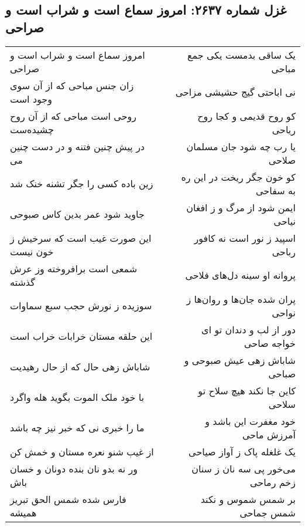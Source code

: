 \begin{center}
\section*{غزل شماره ۲۶۳۷: امروز سماع است و شراب است و صراحی}
\label{sec:2637}
\begin{longtable}{l p{0.5cm} r}
امروز سماع است و شراب است و صراحی
&&
یک ساقی بدمست یکی جمع مباحی
\\
زان جنس مباحی که از آن سوی وجود است
&&
نی اباحتی گیج حشیشی مزاحی
\\
روحی است مباحی که از آن روح چشیده‌ست
&&
کو روح قدیمی و کجا روح ریاحی
\\
در پیش چنین فتنه و در دست چنین می
&&
یا رب چه شود جان مسلمان صلاحی
\\
زین باده کسی را جگر تشنه خنک شد
&&
کو خون جگر ریخت در این ره به سفاحی
\\
جاوید شود عمر بدین کاس صبوحی
&&
ایمن شود از مرگ و ز افغان نیاحی
\\
این صورت غیب است که سرخیش ز خون نیست
&&
اسپید ز نور است نه کافور رباحی
\\
شمعی است برافروخته وز عرش گذشته
&&
پروانه او سینه دل‌های فلاحی
\\
سوزیده ز نورش حجب سبع سماوات
&&
پران شده جان‌ها و روان‌ها ز نواحی
\\
این حلقه مستان خرابات خراب است
&&
دور از لب و دندان تو ای خواجه صاحی
\\
شاباش زهی حال که از حال رهیدیت
&&
شاباش زهی عیش صبوحی و صباحی
\\
با خود ملک الموت بگوید هله واگرد
&&
کاین جا نکند هیچ سلاح تو سلاحی
\\
ما را خبری نی که خبر نیز چه باشد
&&
خود مغفرت این باشد و آمرزش ماحی
\\
از غیب شنو نعره مستان و خمش کن
&&
یک غلغله پاک ز آواز صیاحی
\\
ور نه بدو نان بنده دونان و خسان باش
&&
می‌خور پی سه نان ز سنان زخم رماحی
\\
فارس شده شمس الحق تبریز همیشه
&&
بر شمس شموس و نکند شمس جماحی
\\
\end{longtable}
\end{center}
